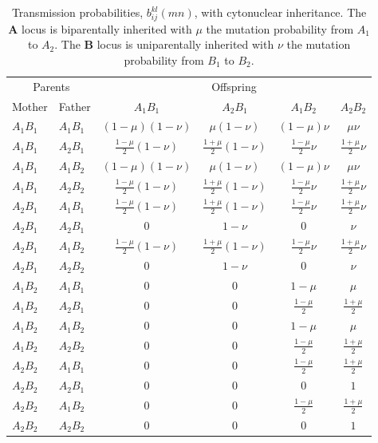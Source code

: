 \documentclass[review,3p,authoryear]{elsarticle}
\begin{document}
\begin{table}[t]
\caption{
Transmission probabilities, $b_{ij}^{kl}(mn)$, with cytonuclear inheritance. 
The $\mathbf{A}$ locus is biparentally inherited with $\mu$ the mutation probability from $A_1$ to $A_2$. 
The $\mathbf{B}$ locus is uniparentally inherited with $\nu$ the mutation probability from $B_1$ to $B_2$.
}
\label{Table:Cyto}
\centering
\begin{tabular}{ll | cccc}
\hline
\multicolumn{2}{c}{Parents} & \multicolumn{4}{c}{Offspring} \\
Mother & Father & $A_1B_1$ & $A_2B_1$ & $A_1B_2$ & $A_2B_2$ \\
\hline
$A_1B_1$ & $A_1B_1$ & 
$(1-\mu)(1-\nu)$ & $\mu(1-\nu)$ & $(1-\mu)\nu$ & $\mu \nu$ \\
$A_1B_1$ & $A_2B_1$ & 
$\frac{1-\mu}{2}(1-\nu)$ & $\frac{1+\mu}{2}(1-\nu)$ & $\frac{1-\mu}{2}\nu$ & $\frac{1+\mu}{2}\nu$ \\
$A_1B_1$ & $A_1B_2$ &
$(1-\mu)(1-\nu)$ & $\mu(1-\nu)$ & $(1-\mu)\nu$ & $\mu\nu$ \\
$A_1B_1$ & $A_2B_2$ & 
$\frac{1-\mu}{2}(1-\nu)$ & $\frac{1+\mu}{2}(1-\nu)$ & $\frac{1-\mu}{2}\nu$ & $\frac{1+\mu}{2}\nu$ \\ 
$A_2B_1$ & $A_1B_1$ & 
$\frac{1-\mu}{2}(1-\nu)$ & $\frac{1+\mu}{2}(1-\nu)$ & $\frac{1-\mu}{2}\nu$ & $\frac{1+\mu}{2}\nu$ \\
$A_2B_1$ & $A_2B_1$ & 
$0$ & $1-\nu$ & $0$ & $\nu$ \\
$A_2B_1$ & $A_1B_2$ & 
$\frac{1-\mu}{2}(1-\nu)$ & $\frac{1+\mu}{2}(1-\nu)$ & $\frac{1-\mu}{2}\nu$ & $\frac{1+\mu}{2}\nu$ \\
$A_2B_1$ & $A_2B_2$ & 
$0$ & $1-\nu$ & $0$ & $\nu$ \\ 	
$A_1B_2$ & $A_1B_1$ & 
$0$ & $0$ & $1-\mu$ & $\mu$ \\
$A_1B_2$ & $A_2B_1$ & 
$0$ & $0$ & $\frac{1-\mu}{2}$ & $\frac{1+\mu}{2}$ \\
$A_1B_2$ & $A_1B_2$ & 
$0$ & $0$ & $1-\mu$ & $\mu$ \\
$A_1B_2$ & $A_2B_2$ & 
$0$ & $0$ & $\frac{1-\mu}{2}$ & $\frac{1+\mu}{2}$ \\
$A_2B_2$ & $A_1B_1$ & 
$0$ & $0$ & $\frac{1-\mu}{2}$ & $\frac{1+\mu}{2}$ \\ 
$A_2B_2$ & $A_2B_1$ & 
$0$ & $0$ & $0$ & $1$ \\ 
$A_2B_2$ & $A_1B_2$ & 
$0$ & $0$ & $\frac{1-\mu}{2}$ & $\frac{1+\mu}{2}$ \\ 
$A_2B_2$ & $A_2B_2$ & 
$0$ & $0$ & $0$ & $1$ \\ 
\hline
\end{tabular}
\end{table}
\end{document}
